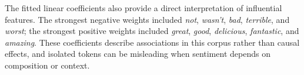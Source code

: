 The fitted linear coefficients also provide a direct interpretation of influential features. The strongest negative weights included \textit{not}, \textit{wasn't}, \textit{bad}, \textit{terrible}, and \textit{worst}; the strongest positive weights included \textit{great}, \textit{good}, \textit{delicious}, \textit{fantastic}, and \textit{amazing}. These coefficients describe associations in this corpus rather than causal effects, and isolated tokens can be misleading when sentiment depends on composition or context.
